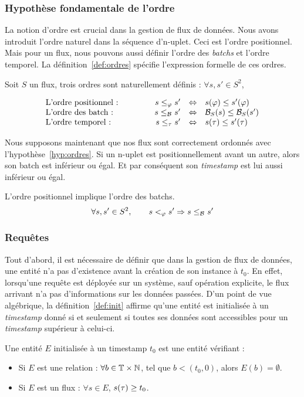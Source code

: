 \subsubsection{Hypothèse fondamentale de l'ordre}
La notion d'ordre est crucial dans la gestion de flux de données. Nous avons introduit l'ordre naturel dans la séquence d'n-uplet. Ceci est l'ordre positionnel. Mais pour un flux, nous pouvons aussi définir l'ordre des \textit{batchs} et l'ordre temporel. La définition~\ref{def:ordres} spécifie l'expression formelle de ces ordres.
\begin{defi}\label{def:ordres}
Soit $S$ un flux, trois ordres sont naturellement définis : $\forall s,s' \in S^2$,

$$\begin{array}{lcrcl} 
\textrm{L'ordre positionnel : } &\qquad & s \leq_\varphi s' & \Leftrightarrow & s(\varphi) \leq s'(\varphi)\\
\textrm{L'ordre des batch : } & & s \leq_{\mathcal{B}_{}} s' &\Leftrightarrow& \mathcal{B}_S(s) \leq \mathcal{B}_S(s')\\
\textrm{L'ordre temporel : } & & s \leq_\tau s' &\Leftrightarrow& s(\tau) \leq s'(\tau)\\
\end{array}$$
\end{defi}

Nous supposons maintenant que nos flux sont correctement ordonnés avec l'hypothèse~\ref{hyp:ordres}. Si un n-uplet est positionnellement avant un autre, alors son batch est inférieur ou égal. Et par conséquent son \textit{timestamp} est lui aussi inférieur ou égal.
\begin{hyp}\label{hyp:ordres}
L'ordre positionnel implique l'ordre des batchs.
$$\forall s, s'\in S^2, \qquad s <_\varphi s' \Rightarrow s \leq_{\mathcal{B}_{}} s'$$
\end{hyp}

\subsubsection{Requêtes}
Tout d'abord, il est nécessaire de définir que dans la gestion de flux de données, une entité n'a pas d'existence avant la création de son instance à $t_0$. En effet, lorsqu'une requête est déployée sur un système, sauf opération explicite, le flux arrivant n'a pas d'informations sur les données passées. D'un point de vue algébrique, la définition~\ref{def:init} affirme qu'une entité est initialisée à un \textit{timestamp} donné si et seulement si toutes ses données sont accessibles pour un \textit{timestamp} supérieur à celui-ci.
\begin{defi}\label{def:init}
	Une entité $E$ initialisée à un timestamp $t_0$ est une entité vérifiant :
	\begin{itemize}
		\item Si $E$ est une relation : $\forall b \in \mathbb{T}\times\mathbb{N}$, tel que $b<(t_0,0)$, alors $E(b) = \emptyset$.
		\item Si $E$ est un flux : $\forall s\in E$, $s(\tau) \geq t_0$.
	\end{itemize}
\end{defi}

